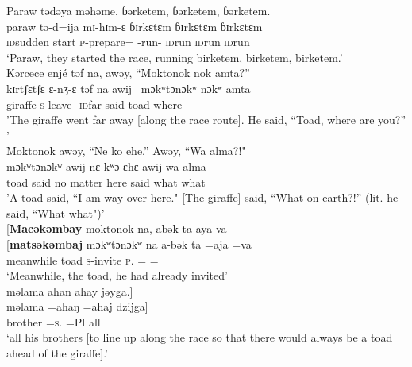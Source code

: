 \ea \label{ex:12:61}
Paraw  tədəya  məhəme,  ɓərketem, ɓərketem, ɓərketem.\\ 
\gll  paraw tə-d=ija mɪ-hɪm-ɛ ɓɪrkɛtɛm ɓɪrkɛtɛm ɓɪrkɛtɛm  \\ 
      {\textsc{id}sudden start} {\textsc{p}-prepare={\PLU}} {\NOM}{}-run{}-{\CL} \textsc{id}run \textsc{id}run \textsc{id}run\\
\glt ‘Paraw, they started the race, running birketem, birketem, birketem.'\\
\medskip
Kərcece  enjé  təf  na,  awəy,  “Moktonok  nok  amta?”\\   
\gll kɪrtʃɛtʃɛ ɛ-nʒ-ɛ təf na awij~  mɔkʷtɔnɔkʷ nɔkʷ amta  \\  
     giraffe \textsc{s}-leave{}-{\CL} \textsc{id}far {\PSP} said toad {\twoS} where \\
\glt 'The giraffe went far away [along the race route]. He said, “Toad, where are you?” '\\
\medskip
Moktonok awəy, “Ne  ko  ehe.”  Awəy,  “Wa  alma?!"\\
\gll mɔkʷtɔnɔkʷ  awij  nɛ  kʷɔ ɛhɛ awij wa  alma\\
       toad said {\oneS} {no matter} {here} said  {what}  {what}\\
\glt    'A toad said, “I am way over here." [The giraffe] said, “What on earth?!” (lit. he said, “What what")'\\
\medskip
\clearpage
{}[\textbf{Macəkəmbay}  moktonok  na,  abək  ta  aya  va\\  
\gll  {}[\textbf{matsəkəmbaj} mɔkʷtɔnɔkʷ na a-bək ta =aja =va\\ 
      {meanwhile}    {toad}    {\PSP}      {\textsc{s}-invite}     {\textsc{p}.{\DO}}   ={\PLU}  ={\PRF}\\  
\glt  ‘Meanwhile, the toad, he had already invited’\\     

\medskip
məlama  ahan  ahay  jəyga.]\\
\gll məlama =ahaŋ =ahaj dzijga]\\
     {brother}  =\textsc{s}.{\POSS}  {=Pl}  {all}\\
\glt  ‘all his brothers [to line up along the race so that there would always be a toad ahead of the giraffe].’\\
\z 

